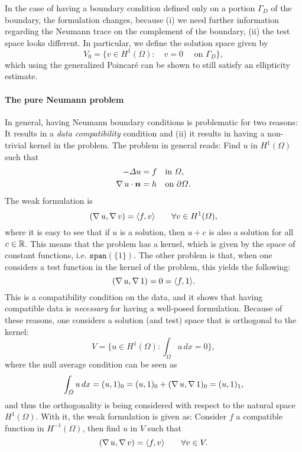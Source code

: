 In the case of having a boundary condition defined only on a portion $\Gamma_D$ of the boundary, the formulation changes, because (i) we need further information regarding the Neumann trace on the complement of the boundary, (ii) the test space looks different. In particular, we define the solution space given by 
    \begin{equation*}
V_0 = \{v\in H^1(\Omega): \quad v = 0 \quad\text{ on $\Gamma_D$}\},
\end{equation*}
which using the generalized Poincaré can be shown to still satisfy an ellipticity estimate. 

\paragraph{The pure Neumann problem} In general, having Neumann boundary conditions is problematic for two reasons: It results in a \emph{data compatibility} condition and (ii) it results in having a non-trivial kernel in the problem. The problem in general reads: Find $u$ in $H^1(\Omega)$ such that
    \begin{equation*}
\begin{aligned}
        -\Delta u &= f && \text{in $\Omega$},\\
        \grad u \cdot \vec n &= h && \text{on $\partial\Omega$}.
       \end{aligned}
\end{equation*}
The weak formulation is 
    \begin{equation*}
(\operatorname{\nabla} u, \operatorname{\nabla} v) = \langle f, v \rangle \qquad \forall v\in H^1(\Omega),
\end{equation*}
where it is easy to see that if $u$ is a solution, then $u+c$ is also a solution for all $c\in \mathbb{R}$. This means that the problem has a kernel, which is given by the space of constant functions, i.e. $\texttt{span}(\{1\})$. The other problem is that, when one considers a test function in the kernel of the problem, this yields the following: 
    \begin{equation*}
(\operatorname{\nabla} u, \operatorname{\nabla} 1) = 0 = \langle f, 1\rangle.
\end{equation*}
This is a compatibility condition on the data, and it shows that having compatible data is \emph{necessary} for having a well-posed formulation. Because of these reasons, one considers a solution (and test) space that is orthogonal to the kernel: 
    \begin{equation*}
V = \{u\in H^1(\Omega): \int_\Omega u \,dx = 0\},
\end{equation*}
where the null average condition can be seen as 
    \begin{equation*}
\int_\Omega u \,dx = (u, 1)_0 = (u,1)_0 + (\operatorname{\nabla} u, \operatorname{\nabla} 1)_0 = (u, 1)_1,
\end{equation*}
and thus the orthogonality is being considered with respect to the natural space $H^1(\Omega)$. With it, the weak formulation is given as: Consider $f$ a compatible function in $H^{-1}(\Omega)$, then find $u$ in $V$ such that
    \begin{equation*}
(\operatorname{\nabla} u, \operatorname{\nabla} v) = \langle f, v\rangle \qquad \forall v\in V.
\end{equation*}
